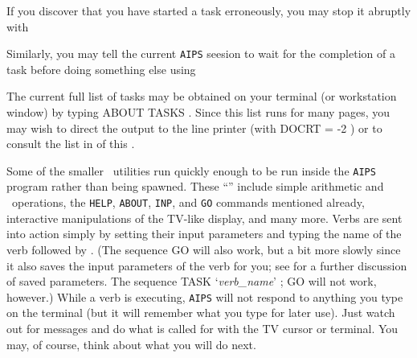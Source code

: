      If you discover that you have started a task erroneously, you may
stop it abruptly with
\btd
{}
\etd
{}

     Similarly, you may tell the current {\tt AIPS} seesion to wait
for the completion of a task before doing something else using
\btd
{}
\etd
{}

     The current full list of tasks may be obtained on your terminal
(or workstation window) by typing {\us ABOUT \qs TASKS \hbox{\CR}}.
Since this list runs for many pages, you may wish to direct the output
to the line printer (with {\us DOCRT = -2 \CR}) or to consult the
list in  of this \Cookbook.


     Some of the smaller \AIPS\ utilities run quickly enough to be run
inside the {\tt AIPS} program rather than being spawned.  These
``'' include simple arithmetic and \POPS\
operations, the {\tt HELP}, {\tt ABOUT}, {\tt INP}, and {\tt GO}
commands mentioned already, interactive manipulations of the TV-like
display, and many more.  Verbs are sent into action simply by setting
their input parameters and typing the name of the verb followed by
\hbox{\CR}. (The sequence {\us GO \qs {\it verb\_name\/} \CR} will also
work, but a bit more slowly since it also saves the input parameters
of the verb for you; see \Sec{inputs} for a further discussion of saved
parameters. The sequence {\us TASK \qs `{\it verb\_name\/}' ;  \qs GO
\CR} will not work, however.)  While a verb is executing, {\tt AIPS}
will not respond to anything you type on the terminal (but it will
remember what you type for later use).  Just watch out for messages
and do what is called for with the TV cursor or terminal.  You may, of
course, think about what you will do next.

